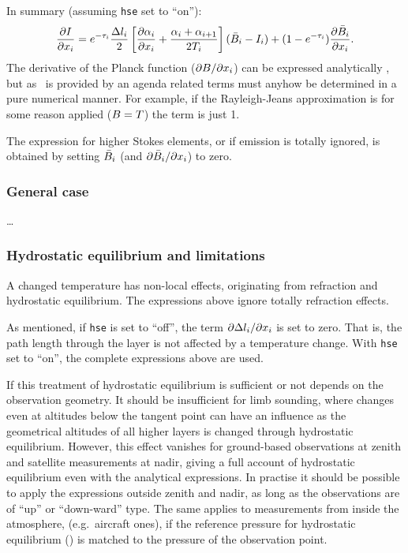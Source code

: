 In summary (assuming \verb|hse| set to ``on''):
\begin{equation}
  \frac{\partial I}{\partial x_{i}} =
   e^{-\tau_{i}}\frac{\Delta l_{i}}{2}\left[
      \frac{\partial{\alpha}_{i}}{\partial x_{i}} + 
  \frac{{\alpha}_{i}+{\alpha}_{i+1}}{2T_{i}}
  \right](\bar{B}_i-I_{i})+
  (1-e^{-\tau_{i}})\frac{\partial\bar{B}_i}{\partial x_{i}}.  
\end{equation}
The derivative of the Planck function ($\partial B/\partial x_{i}$) can
be expressed analytically \citep{eriksson:studi:02}, but as \Planck\ is
provided by an agenda related terms must anyhow be determined in a pure
numerical manner. For example, if the Rayleigh-Jeans approximation is for some
reason applied ($B=T$) the term is just 1.

The expression for higher Stokes elements, or if emission is totally ignored,
is obtained by setting $\bar{B}_i$
(and $\partial\bar{B}_i/\partial x_{i}$) to zero.


\subsubsection{General case}
%
\dots



\subsubsection{Hydrostatic equilibrium and limitations}
%
A changed temperature has non-local effects, originating from refraction and
hydrostatic equilibrium. The expressions above ignore totally refraction
effects. 

As  mentioned,  if \verb|hse|  is  set  to  ``off'',  the term  $\partial  \Delta
l_{i}/\partial x_{i}$  is set  to  zero. That  is,  the path  length
through the layer is not affected  by a temperature change. With \verb|hse| set
to ``on'', the complete expressions above are used.

If this treatment of hydrostatic equilibrium is sufficient or not depends on
the observation geometry. It should be insufficient for limb sounding,
where changes even at altitudes below the tangent point can have an influence
as the geometrical altitudes of all higher layers is changed through
hydrostatic equilibrium.  However, this effect vanishes for
ground-based observations at zenith and satellite measurements at nadir, giving
a full account of hydrostatic equilibrium even with the analytical expressions.
In practise it should be possible to apply the expressions outside zenith and
nadir, as long as the observations are of ``up'' or ``down-ward'' type. The
same applies to measurements from inside the atmosphere, (e.g.\ aircraft ones),
if the reference pressure for hydrostatic equilibrium () is
matched to the pressure of the observation point.





